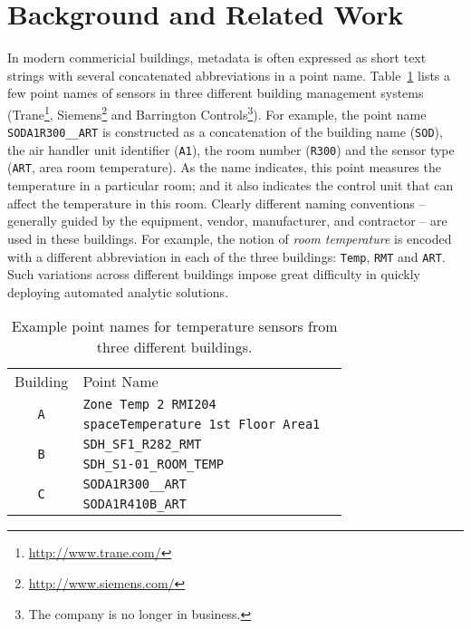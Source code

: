 \section{Background and Related Work}

In modern commericial buildings,
metadata is often expressed as short
text strings with several concatenated abbreviations in a point name. Table~\ref{table:ex} lists
a few point names of sensors in three different building management systems
(Trane\footnote{\url{http://www.trane.com/}}, Siemens\footnote{\url{http://www.siemens.com/}}
and Barrington Controls\footnote{The company is no longer in business.}).
For example, the point name \texttt{SODA1R300\_\_ART} is constructed as a
concatenation of the building name (\texttt{SOD}), the air handler unit
identifier (\texttt{A1}), the room number (\texttt{R300}) and the sensor type
(\texttt{ART}, area room temperature). As the name indicates, this point measures
the temperature in a particular room; and it also indicates the control unit that
can affect the temperature in this room. Clearly different naming conventions --
generally guided by the equipment, vendor, manufacturer,
and contractor --
are used in these buildings. For example, the notion of {\em room temperature} is encoded
with a different abbreviation in each of the three buildings: \texttt{Temp}, \texttt{RMT} and \texttt{ART}.
Such variations across different buildings impose great difficulty in quickly deploying automated analytic
solutions.

\begin{table}[h]
\centering
\begin{tabular}{c|ll}
\cline{1-2}
Building & Point Name & \\
\cline{1-2}
\multirow{2}{*}{\texttt{A}}  & \texttt{Zone Temp 2 RMI204} &  \\
					& \texttt{spaceTemperature 1st Floor Area1} &  \\ \cline{1-2}
\multirow{2}{*}{\texttt{B}} & \texttt{SDH\_SF1\_R282\_RMT} &  \\
                     & \texttt{SDH\_S1-01\_ROOM\_TEMP} &  \\ \cline{1-2}
\multirow{2}{*}{\texttt{C}}  & \texttt{SODA1R300\_\_ART} &  \\
					  & \texttt{SODA1R410B\_ART} &  \\ \cline{1-2}
\end{tabular}
\caption{Example point names for temperature sensors from three different buildings.}
\label{table:ex}
\end{table}


